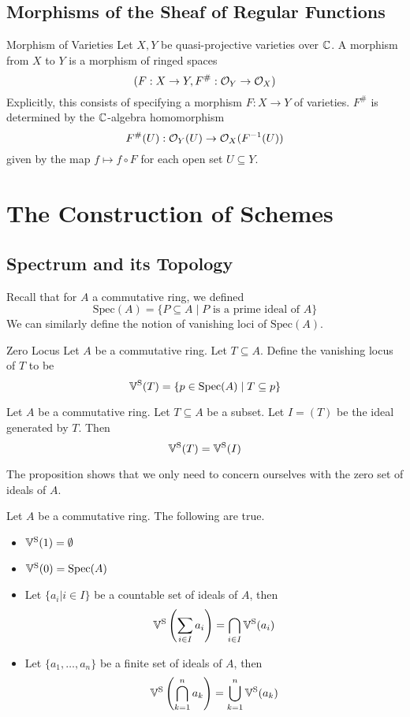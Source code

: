 \documentclass[a4paper]{article}
\begin{document}
\subsection{Morphisms of the Sheaf of Regular Functions}
\begin{defn}{Morphism of Varieties}{} Let $X,Y$ be quasi-projective varieties over $\mathbb{C}$. A morphism from $X$ to $Y$ is a morphism of ringed spaces $$(F:X\to Y,F^\#:\mathcal{O}_Y\to\mathcal{O}_X)$$ Explicitly, this consists of specifying a morphism $F:X\to Y$ of varieties. $F^\#$ is determined by the $\mathbb{C}$-algebra homomorphism $$F^\#(U):\mathcal{O}_Y(U)\to\mathcal{O}_X(F^{-1}(U))$$ given by the map $f\mapsto f\circ F$ for each open set $U\subseteq Y$. 
\end{defn}

\pagebreak
\section{The Construction of Schemes}
\subsection{Spectrum and its Topology}
Recall that for $A$ a commutative ring, we defined $$\text{Spec}(A)=\{P\subseteq A\;|\;P\text{ is a prime ideal of }A\}$$ We can similarly define the notion of vanishing loci of $\text{Spec}(A)$. 

\begin{defn}{Zero Locus}{} Let $A$ be a commutative ring. Let $T\subseteq A$. Define the vanishing locus of $T$ to be $$\mathbb{V}^\text{S}(T)=\{p\in\text{Spec}(A)\;|\;T\subseteq p\}$$
\end{defn}

\begin{prp}{}{} Let $A$ be a commutative ring. Let $T\subseteq A$ be a subset. Let $I=(T)$ be the ideal generated by $T$. Then $$\mathbb{V}^\text{S}(T)=\mathbb{V}^\text{S}(I)$$
\end{prp}

The proposition shows that we only need to concern ourselves with the zero set of ideals of $A$. 

\begin{lmm}{}{} Let $A$ be a commutative ring. The following are true. 
\begin{itemize}
\item $\mathbb{V}^\text{S}(1)=\emptyset$
\item $\mathbb{V}^\text{S}(0)=\text{Spec}(A)$
\item Let $\{a_i|i\in I\}$ be a countable set of ideals of $A$, then $$\mathbb{V}^\text{S}\left(\sum_{i\in I}a_i\right)=\bigcap_{i\in I}\mathbb{V}^\text{S}(a_i)$$
\item Let $\{a_1,\dots,a_n\}$ be a finite set of ideals of $A$, then $$\mathbb{V}^\text{S}\left(\bigcap_{k=1}^na_k\right)=\bigcup_{k=1}^n\mathbb{V}^\text{S}(a_k)$$
\end{itemize}
\end{lmm}
\end{document}
